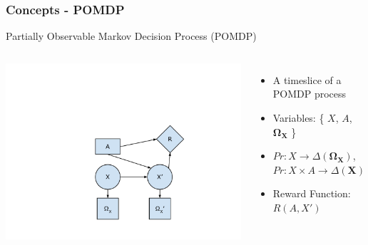 \documentclass{beamer}
\begin{document}
\begin{frame}
\frametitle{Concepts - POMDP}
Partially Observable Markov Decision Process (POMDP)
\vspace{.3cm}
\begin{columns}[c]
\includegraphics[trim = 45mm 20mm 30mm 50mm, clip, width=\textwidth]{fig/fig-pomdp-simple.pdf}
\begin{itemize}
\item A timeslice of a POMDP process
\item Variables: \{ $X$, $A$, $\mathbf{\Omega_{X}}$ \}
\item $Pr : X \to \Delta(\mathbf{\Omega_{X}})$, $Pr : X \times A \to \Delta(\mathbf{X})$
\item Reward Function: $R(A, X')$
\end{itemize}
\end{columns}
\end{frame}
\end{document}
